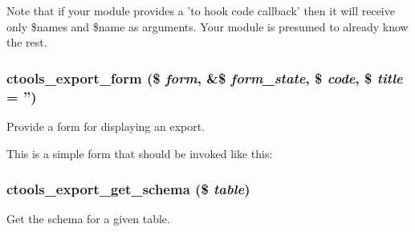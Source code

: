 Note that if your module provides a 'to hook code callback' then it will receive only \$names and \$name as arguments. Your module is presumed to already know the rest. \hypertarget{export_8inc_aa4dfb26eccb717cb0f1287c29ae28499}{
\subsubsection[{ctools\_\-export\_\-form}]{\setlength{\rightskip}{0pt plus 5cm}ctools\_\-export\_\-form (\$ {\em form}, \/  \&\$ {\em form\_\-state}, \/  \$ {\em code}, \/  \$ {\em title} = {\ttfamily ''})}}
\label{export_8inc_aa4dfb26eccb717cb0f1287c29ae28499}
Provide a form for displaying an export.

This is a simple form that should be invoked like this: 
 \hypertarget{export_8inc_a88e1b7c5b516030dc34cab73f6a2ee70}{
\subsubsection[{ctools\_\-export\_\-get\_\-schema}]{\setlength{\rightskip}{0pt plus 5cm}ctools\_\-export\_\-get\_\-schema (\$ {\em table})}}
\label{export_8inc_a88e1b7c5b516030dc34cab73f6a2ee70}
Get the schema for a given table.

